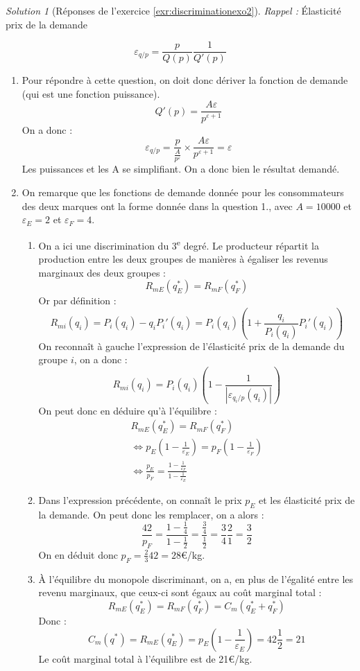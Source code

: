\documentclass[
]{book}
\providecommand{\tightlist}{%
  \setlength{\itemsep}{0pt}\setlength{\parskip}{0pt}}
\theoremstyle{definition}
\theoremstyle{definition}
\theoremstyle{definition}
\theoremstyle{definition}
\theoremstyle{remark}
\newtheorem*{solution}{Solution}
\begin{document}
\begin{solution}[Réponses de l'exercice \ref{exr:discriminationexo2}]

\emph{Rappel :} Élasticité prix de la demande

\[\varepsilon_{q/p}=\frac{p}{Q(p)}\frac{1}{Q'(p)}\]

\begin{enumerate}
\def\labelenumi{\arabic{enumi}.}
\tightlist
\item
  Pour répondre à cette question, on doit donc dériver la fonction de demande (qui est une fonction puissance).
  \[Q'(p)=\frac{A\varepsilon}{p^{\varepsilon+1}}\]
  On a donc :
  \[\varepsilon_{q/p} =\frac{p}{\frac{A}{p^\varepsilon}}\times\frac{A\varepsilon}{p^{\varepsilon+1}}=\varepsilon\]
  Les puissances et les A se simplifiant.
  On a donc bien le résultat demandé.
\item
  On remarque que les fonctions de demande donnée pour les consommateurs des deux marques ont la forme donnée dans la question 1., avec \(A=10000\) et \(\varepsilon_E=2\) et \(\varepsilon_F=4\).

  \begin{enumerate}
  \def\labelenumii{\alph{enumii}.}
  \tightlist
  \item
    On a ici une discrimination du 3\textsuperscript{e} degré.
    Le producteur répartit la production entre les deux groupes de manières à égaliser les revenus marginaux des deux groupes :
    \[R_{mE}(q^*_E)=R_{mF}(q^*_F)\]
    Or par définition :
    \[R_{mi}(q_i)=P_i(q_i)-q_iP_i'(q_i)=P_i(q_i)\left(1+\frac{q_i}{P_i(q_i)}P_i'(q_i)\right)\]
    On reconnaît à gauche l'expression de l'élasticité prix de la demande du groupe \(i\), on a donc :
    \[R_{mi}(q_i)=P_i(q_i)\left(1-\frac{1}{|\varepsilon_{q_i/p}(q_i)|}\right)\]
    On peut donc en déduire qu'à l'équilibre :
    \begin{gather*}
    R_{mE}(q^*_E)=R_{mF}(q^*_F)\\
    \Leftrightarrow p_E\left(1-\frac{1}{\varepsilon_E}\right) = p_F\left(1-\frac{1}{\varepsilon_F}\right) \\
    \Leftrightarrow \frac{p_E}{p_F}=\frac{1-\frac{1}{\varepsilon_F}}{1-\frac{1}{\varepsilon_E}}
    \end{gather*}
  \item
    Dans l'expression précédente, on connaît le prix \(p_E\) et les élasticité prix de la demande.
    On peut donc les remplacer, on a alors :
    \[\frac{42}{p_F}=\frac{1-\frac{1}{4}}{1-\frac{1}{2}}=\frac{\frac{3}{4}}{\frac{1}{2}}=\frac{3}{4}\frac{2}{1}=\frac{3}{2}\]
    On en déduit donc \(p_F=\frac{2}{3}42=28\)€/kg.
  \item
    À l'équilibre du monopole discriminant, on a, en plus de l'égalité entre les revenu marginaux, que ceux-ci sont égaux au coût marginal total :
    \[R_{mE}(q^*_E)=R_{mF}(q^*_F)=C_m(q_E^*+q_F^*)\]
    Donc :
    \[C_m(q^*)=R_{mE}(q^*_E)=p_E\left(1-\frac{1}{\varepsilon_E}\right)=42\frac{1}{2}=21\]
    Le coût marginal total à l'équilibre est de 21€/kg.
  \end{enumerate}
\end{enumerate}

\end{solution}
\end{document}
